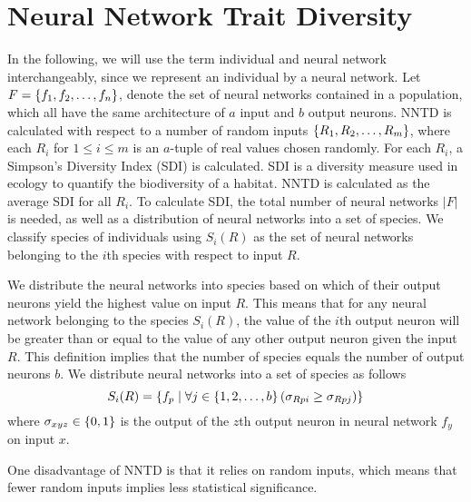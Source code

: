 \section{Neural Network Trait Diversity}
In the following, we will use the term individual and neural network interchangeably, since we represent an individual by a neural network.  Let $F = \{ f_1, f_2, \dots, f_n \}$, denote the set of neural networks contained in a population, which all have the same architecture of $a$ input and $b$ output neurons. NNTD is calculated with respect to a number of random inputs $\{ R_1, R_2, \dots, R_m \}$, where each $R_i$ for $1 \leq i \leq m$ is an $a$-tuple of real values chosen randomly. For each $R_i$, a Simpson's Diversity Index (SDI) is calculated. SDI is a diversity measure used in ecology to quantify the biodiversity of a habitat. NNTD is calculated as the average SDI for all $R_i$.
To calculate SDI, the total number of neural networks $\lvert F \lvert$ is needed, as well as a distribution of neural networks into a set of species. We classify species of individuals using $S_i(R)$ as the set of neural networks belonging to the $i$th species with respect to input $R$.

We distribute the neural networks into species based on which of their output neurons yield the highest value on input $R$. This means that for any neural network belonging to the species $S_i(R)$, the value of the $i$th output neuron will be greater than or equal to the value of any other output neuron given the input $R$.  This definition implies that the number of species equals the number of output neurons $b$. We distribute neural networks into a set of species as follows
%
\begin{equation*}\label{eq:species}
  S_i(R) = \{ f_p \mid \forall j \in \{ 1, 2, \dots, b \} \left(\sigma_{Rpi} \geq \sigma_{Rpj}\right) \}
\end{equation*}
%
where $\sigma_{xyz} \in \{ 0, 1 \}$ is the output of the $z$th output neuron in neural network $f_y$ on input $x$.

One disadvantage of NNTD is that it relies on random inputs, which means that fewer random inputs implies less statistical significance.
